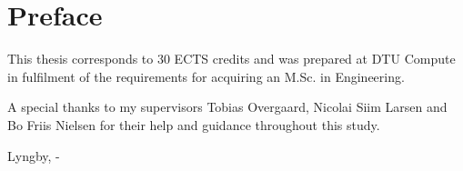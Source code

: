 \chapter{Preface}

This thesis corresponds to 30 ECTS credits and was prepared at DTU Compute in fulfilment of the requirements for acquiring an M.Sc. in Engineering.

A special thanks to my supervisors Tobias Overgaard, Nicolai Siim Larsen and Bo Friis Nielsen for their help and guidance throughout this study.


\vspace{20mm}
\begin{center}
    \hspace{20mm} Lyngby, \thesishandin-\thesisyear
    \vspace{5mm}
    \newline
\end{center}
\begin{flushright}
    \thesisauthor
\end{flushright}




